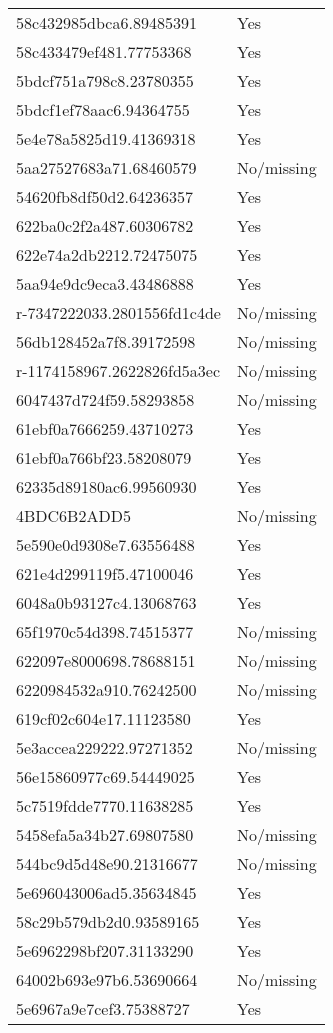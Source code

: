 \begin{tabular}{ll}
58c432985dbca6.89485391 & Yes \\
58c433479ef481.77753368 & Yes \\
5bdcf751a798c8.23780355 & Yes \\
5bdcf1ef78aac6.94364755 & Yes \\
5e4e78a5825d19.41369318 & Yes \\
5aa27527683a71.68460579 & No/missing \\
54620fb8df50d2.64236357 & Yes \\
622ba0c2f2a487.60306782 & Yes \\
622e74a2db2212.72475075 & Yes \\
5aa94e9dc9eca3.43486888 & Yes \\
r-7347222033.2801556fd1c4de & No/missing \\
56db128452a7f8.39172598 & No/missing \\
r-1174158967.2622826fd5a3ec & No/missing \\
6047437d724f59.58293858 & No/missing \\
61ebf0a7666259.43710273 & Yes \\
61ebf0a766bf23.58208079 & Yes \\
62335d89180ac6.99560930 & Yes \\
4BDC6B2ADD5 & No/missing \\
5e590e0d9308e7.63556488 & Yes \\
621e4d299119f5.47100046 & Yes \\
6048a0b93127c4.13068763 & Yes \\
65f1970c54d398.74515377 & No/missing \\
622097e8000698.78688151 & No/missing \\
6220984532a910.76242500 & No/missing \\
619cf02c604e17.11123580 & Yes \\
5e3accea229222.97271352 & No/missing \\
56e15860977c69.54449025 & Yes \\
5c7519fdde7770.11638285 & Yes \\
5458efa5a34b27.69807580 & No/missing \\
544bc9d5d48e90.21316677 & No/missing \\
5e696043006ad5.35634845 & Yes \\
58c29b579db2d0.93589165 & Yes \\
5e6962298bf207.31133290 & Yes \\
64002b693e97b6.53690664 & No/missing \\
5e6967a9e7cef3.75388727 & Yes \\

\end{tabular}
